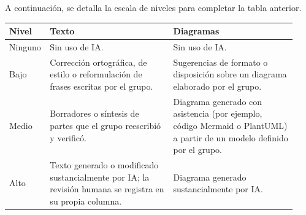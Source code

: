 \documentclass[11pt]{article}
\begin{document}
A continuación, se detalla la escala de niveles para completar la tabla anterior.

\begin{tabular}{@{}p{0.069\linewidth}p{0.429\linewidth}p{0.429\linewidth}@{}}
\toprule Nivel & Texto & Diagramas \\
\midrule
Ninguno & Sin uso de IA. & Sin uso de IA. \\
Bajo & Corrección ortográfica, de estilo o reformulación de frases escritas por el grupo. & Sugerencias de formato o disposición sobre un diagrama elaborado por el grupo. \\
Medio & Borradores o síntesis de partes que el grupo reescribió y verificó. & Diagrama generado con asistencia (por ejemplo, código Mermaid o PlantUML) a partir de un modelo definido por el grupo. \\
Alto & Texto generado o modificado sustancialmente por IA; la revisión humana se registra en su propia columna. & Diagrama generado sustancialmente por IA. \\
\bottomrule
\end{tabular}

\ossFinalPage
\end{document}
